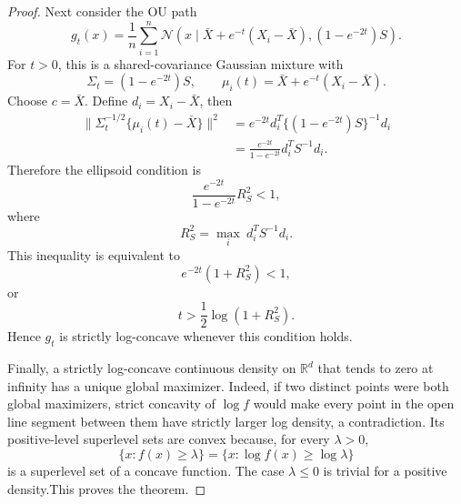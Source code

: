 \documentclass[preprint]{imsart}
\theoremstyle{plain}
\theoremstyle{definition}
\newcommand{\R}{\mathbb{R}}
\newcommand{\Normal}{\mathcal{N}}
\begin{document}
\begin{appendix}
\begin{proof}
Next consider the OU path
\[
  g_t(x)
  =
  \frac1n\sum_{i=1}^n
  \Normal\left(
    x\mid \bar X+e^{-t}(X_i-\bar X),
    (1-e^{-2t})S
  \right).
\]
For \(t>0\), this is a shared-covariance Gaussian mixture with
\[
  \Sigma_t=(1-e^{-2t})S,
  \qquad
  \mu_i(t)=\bar X+e^{-t}(X_i-\bar X).
\]
Choose \(c=\bar X\). Define $d_i = X_i - \bar{X}$, then 
\begin{align*}
  \|\Sigma_t^{-1/2}\{\mu_i(t)-\bar X\}\|^2
  &=
  e^{-2t}d_i^T\{(1-e^{-2t})S\}^{-1}d_i\\
  &=
  \frac{e^{-2t}}{1-e^{-2t}}
  d_i^TS^{-1}d_i.
\end{align*}
Therefore the ellipsoid condition is
\[
  \frac{e^{-2t}}{1-e^{-2t}}R_S^2<1,
\]
where
\[
  R_S^2=\max_i~ d_i^T S^{-1} d_i.
\]
This inequality is equivalent to
\[
  e^{-2t}(1+R_S^2)<1,
\]
or
\[
  t>\frac12\log(1+R_S^2).
\]
Hence \(g_t\) is strictly log-concave whenever this condition holds.

Finally, a strictly log-concave continuous density on \(\R^d\) that tends
to zero at infinity has a unique global maximizer. Indeed, if two distinct
points were both global maximizers, strict concavity of \(\log f\) would
make every point in the open line segment between them have strictly larger
log density, a contradiction. Its positive-level superlevel sets are convex because, for every
\(\lambda>0\),
\[
  \{x:f(x)\ge \lambda\}
  =
  \{x:\log f(x)\ge \log \lambda\}
\]
is a superlevel set of a concave function. The case \(\lambda\le0\) is
trivial for a positive density.This
proves the theorem.
\end{proof}
\end{appendix}







\end{document}
